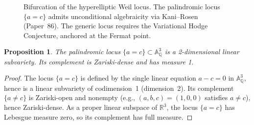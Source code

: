 \documentclass[11pt,a4paper]{article}
\newtheorem{proposition}[theorem]{Proposition}
\theoremstyle{definition}
\theoremstyle{remark}
\newcommand{\QQ}{\mathbb{Q}}
\newcommand{\RR}{\mathbb{R}}
\newcommand{\Aff}{\mathbb{A}}
\begin{document}
\begin{figure}[h]
\centering
{}
\caption{Bifurcation of the hyperelliptic Weil locus.
The palindromic locus $\{a=c\}$ admits unconditional algebraicity via
Kani--Rosen (Paper~86).
The generic locus requires the Variational Hodge Conjecture, anchored
at the Fermat point.}
\label{fig:bifurcation}
\end{figure}

\begin{proposition}
The palindromic locus $\{a = c\} \subset \Aff^3_\QQ$ is a 2-dimensional
linear subvariety.
Its complement is Zariski-dense and has measure 1.
\end{proposition}

\begin{proof}
The locus $\{a = c\}$ is defined by the single linear equation $a - c = 0$
in $\Aff^3_\QQ$, hence is a linear subvariety of codimension~1 (dimension~2).
Its complement $\{a \neq c\}$ is Zariski-open and nonempty (e.g.,
$(a,b,c) = (1,0,0)$ satisfies $a \neq c$), hence Zariski-dense.
As a proper linear subspace of $\RR^3$, the locus $\{a = c\}$ has
Lebesgue measure zero, so its complement has full measure.
\end{proof}
\end{document}
